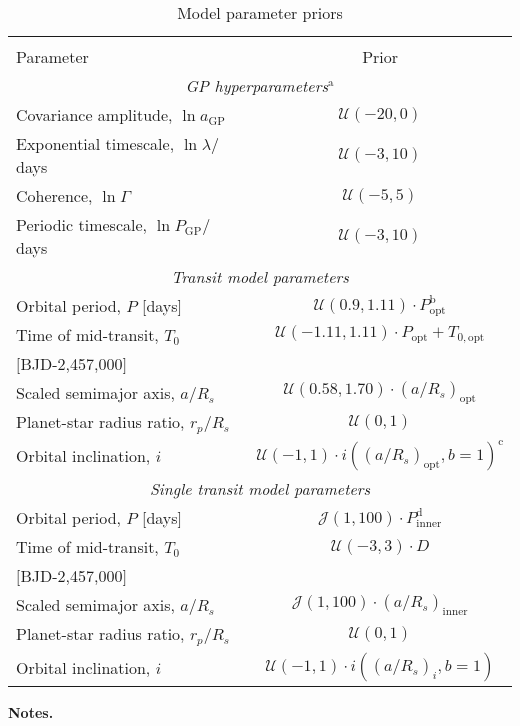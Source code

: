 \begin{table*}
  \small
  \renewcommand{\arraystretch}{0.7}
  \caption{Model parameter priors}
  \label{oriontable:priors}
  \begin{tabular}{lc}
    \hline \\ [-1ex]
    Parameter & Prior \\
    \hline
    \multicolumn{2}{c}{\emph{GP hyperparameters}$^{\text{a}}$} \\
    Covariance amplitude, $\ln{a_{\text{GP}}}$ & $\mathcal{U}(-20,0)$ \\
    Exponential timescale, $\ln{\lambda/}$days & $\mathcal{U}(-3,10)$ \\
    Coherence, $\ln{\Gamma}$ & $\mathcal{U}(-5,5)$ \\
    Periodic timescale, $\ln{P_{\text{GP}}/}$days & $\mathcal{U}(-3,10)$  \\
    \multicolumn{2}{c}{\emph{Transit model parameters}} \\
    Orbital period, $P$ [days] & $\mathcal{U}(0.9,1.11)\cdot P_{\text{opt}}^{\text{b}}$ \\
    Time of mid-transit, $T_0$ & $\mathcal{U}(-1.11,1.11)\cdot P_{\text{opt}} + T_{0,\text{opt}}$ \\
    $[$BJD-2,457,000$]$ & \\
    Scaled semimajor axis, $a/R_s$ & $\mathcal{U}(0.58,1.70)\cdot (a/R_s)_{\text{opt}}$ \\
    Planet-star radius ratio, $r_p/R_s$ & $\mathcal{U}(0,1)$ \\
    Orbital inclination, $i$ & $\mathcal{U}(-1,1)\cdot i((a/R_s)_{\text{opt}},b=1)^{\text{c}}$ \\
    \multicolumn{2}{c}{\emph{Single transit model parameters}} \\
    Orbital period, $P$ [days] & $\mathcal{J}(1,100)\cdot P_{\text{inner}}^{\text{d}}$ \\
    Time of mid-transit, $T_0$ & $\mathcal{U}(-3,3)\cdot D$ \\
    $[$BJD-2,457,000$]$ & \\
    Scaled semimajor axis, $a/R_s$ & $\mathcal{J}(1,100)\cdot (a/R_s)_{\text{inner}}$ \\
    Planet-star radius ratio, $r_p/R_s$ & $\mathcal{U}(0,1)$ \\
    Orbital inclination, $i$ & $\mathcal{U}(-1,1)\cdot i((a/R_s)_i,b=1)$ \\
  \end{tabular}
  \begin{list}{}{}
  \item {\bf{Notes.}}

\end{list}
\end{table*}
